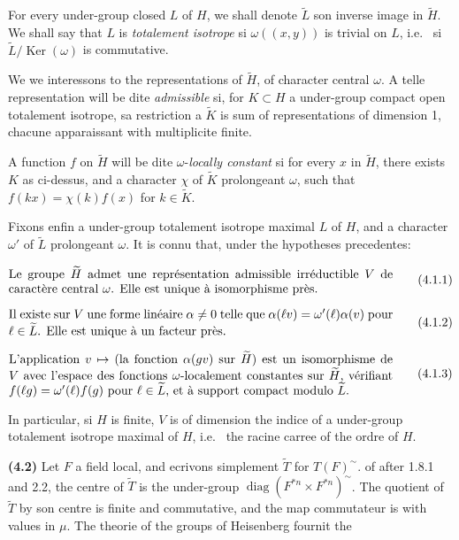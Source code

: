\documentclass[12pt,a4paper]{article}
\theoremstyle{plain}
\theoremstyle{definition}
\theoremstyle{remark}
\DeclareMathOperator{\diag}{diag}
\DeclareMathOperator{\Ker}{Ker}
\newcommand{\wt}{\widetilde}
\providecommand{\Ker}{\operatorname{Ker}}
\begin{document}
For every under-group closed $L$ of $H$, we shall denote $\wt{L}$ son inverse image in $\wt{H}$. We shall say that $L$ is \emph{totalement isotrope} si $\omega((x, y))$ is trivial on $L$, i.e.
\ si $\wt{L} / \Ker(\omega)$ is commutative.

We we interessons to the representations of $\wt{H}$, of character central $\omega$. A telle representation will be dite \emph{admissible} si, for $K \subset H$ a under-group compact open totalement isotrope, sa restriction a $\wt{K}$ is sum of representations of dimension 1, chacune apparaissant with multiplicite finite.

A function $f$ on $\wt{H}$ will be dite $\omega$-\emph{locally constant} si for every $x$ in $\wt{H}$, there exists $K$ as ci-dessus, and a character $\chi$ of $\wt{K}$ prolongeant $\omega$, such that $f(kx) = \chi(k) f(x)$ for $k \in \wt{K}$.

Fixons enfin a under-group totalement isotrope maximal $L$ of $H$, and a character $\omega'$ of $\wt{L}$ prolongeant $\omega$. It is connu that, under the hypotheses precedentes:

\begin{equation}\label{eq:4.1.1}
\parbox{0.9\textwidth}{
Le groupe $\wt{H}$ admet une représentation admissible irréductible $V$ de caractère central $\omega$. Elle est unique à isomorphisme près.
}
\tag{4.1.1}
\end{equation}

\begin{equation}\label{eq:4.1.2}
\parbox{0.9\textwidth}{
Il existe sur $V$ une forme linéaire $\alpha \neq 0$ telle que $\alpha(\ell v) = \omega'(\ell) \alpha(v)$ pour $\ell \in \wt{L}$. Elle est unique à un facteur près.
}
\tag{4.1.2}
\end{equation}

\begin{equation}\label{eq:4.1.3}
\parbox{0.9\textwidth}{
L'application $v \mapsto$ (la fonction $\alpha(gv)$ sur $\wt{H}$) est un isomorphisme de $V$ avec l'espace des fonctions $\omega$-localement constantes sur $\wt{H}$, vérifiant $f(\ell g) = \omega'(\ell) f(g)$ pour $\ell \in \wt{L}$, et à support compact modulo $\wt{L}$.
}
\tag{4.1.3}
\end{equation}

In particular, si $H$ is finite, $V$ is of dimension the indice of a under-group totalement isotrope maximal of $H$, i.e.
\ the racine carree of the ordre of $H$.

\textbf{(4.2)} Let $F$ a field local, and ecrivons simplement $\wt{T}$ for $T(F)^\sim$. of after 1.8.1 and 2.2, the centre of $\wt{T}$ is the under-group $\diag(F^{*n} \times F^{*n})^\sim$. The quotient of $\wt{T}$ by son centre is finite and commutative, and the map commutateur is with values in $\mu$. The theorie of the groups of Heisenberg fournit the
\end{document}
